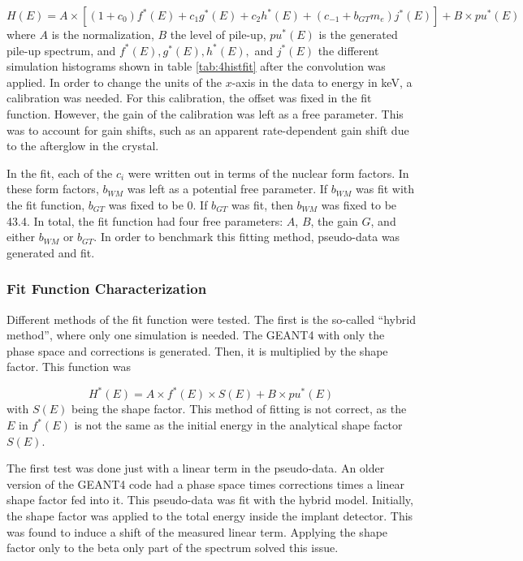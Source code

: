 \documentclass[../MaxHughesThesis.tex]{subfiles}
\begin{document}
\begin{equation}
	H(E) = A \times [( 1 + c_{0}) f^{*}(E) + c_{1}g^{*}(E) + c_{2} h^{*}(E) + (c_{-1} + b_{GT} m_{e}) j^{*}(E)] + B \times pu^{*}(E)
	\label{eq:betafit}
\end{equation}
where $A$ is the normalization, $B$ the level of pile-up, $pu^{*}(E)$ is the generated pile-up spectrum, and $f^{*}(E),g^{*}(E),h^{*}(E),$ and $j^{*}(E)$ the different simulation histograms shown in table \ref{tab:4histfit} after the convolution was applied.
In order to change the units of the $x$-axis in the data to energy in keV, a calibration was needed.
For this calibration, the offset was fixed in the fit function.
However, the gain of the calibration was left as a free parameter.
This was to account for gain shifts, such as an apparent rate-dependent gain shift due to the afterglow in the crystal.

In the fit, each of the $c_{i}$ were written out in terms of the nuclear form factors.
In these form factors, $b_{WM}$ was left as a potential free parameter. 
If $b_{WM}$ was fit with the fit function, $b_{GT}$ was fixed to be 0. 
If $b_{GT}$ was fit, then $b_{WM}$ was fixed to be 43.4. 
In total, the fit function had four free parameters: $A$, $B$, the gain $G$, and either $b_{WM}$ or $b_{GT}$. 
In order to benchmark this fitting method, pseudo-data was generated and fit.

\subsubsection{Fit Function Characterization}
Different methods of the fit function were tested. 
The first is the so-called ``hybrid method'', where only one simulation is needed.
The GEANT4 with only the phase space and corrections is generated. 
Then, it is multiplied by the shape factor.
This function was 

\begin{equation}
	H^{*}(E) = A \times f^{*}(E) \times S(E) + B \times pu^{*}(E)
	\label{eq:hybridmodel}
\end{equation}
with $S(E)$ being the shape factor. 
This method of fitting is not correct, as the $E$ in $f^{*}(E)$ is not the same as the initial energy in the analytical shape factor $S(E)$. 

The first test was done just with a linear term in the pseudo-data.
An older version of the GEANT4 code had a phase space times corrections times a linear shape factor fed into it.
This pseudo-data was fit with the hybrid model.
Initially, the shape factor was applied to the total energy inside the implant detector.
This was found to induce a shift of the measured linear term.
Applying the shape factor only to the beta only part of the spectrum solved this issue. 
\end{document}
